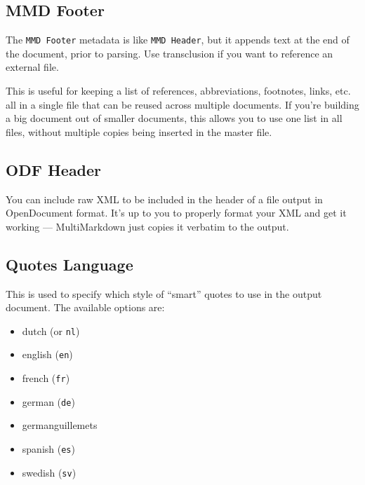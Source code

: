 \subsection{MMD Footer}
\label{mmdfooter}

The \texttt{MMD Footer} metadata is like \texttt{MMD Header}, but it appends text at the end of the document, prior to parsing. Use transclusion if you want to reference an external file.

This is useful for keeping a list of references, abbreviations, footnotes, links, etc. all in a single file that can be reused across multiple documents. If you're building a big document out of smaller documents, this allows you to use one list in all files, without multiple copies being inserted in the master file.

\subsection{ODF Header}
\label{odfheader}

You can include raw XML to be included in the header of a file output in
OpenDocument format. It's up to you to properly format your XML and get it
working --- MultiMarkdown just copies it verbatim to the output.

\subsection{Quotes Language}
\label{quoteslanguage}

This is used to specify which style of ``smart'' quotes to use in the output document. The available options are:

\begin{itemize}
\item dutch (or \texttt{nl})

\item english (\texttt{en})

\item french (\texttt{fr})

\item german (\texttt{de})

\item germanguillemets

\item spanish (\texttt{es})

\item swedish (\texttt{sv})

\end{itemize}

